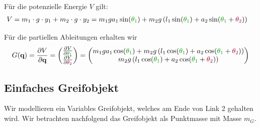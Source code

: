 \documentclass[a4paper, 12pt]{scrartcl}
\newcommand{\gruen}[2][gruen]{\textcolor{#1}{#2}}
\newcommand{\dunkelrot}[2][dunkelrot]{\textcolor{#1}{#2}}
\begin{document}
Für die potenzielle Energie $V$ gilt:
\begin{align*}
    V 
    &= m_1 \cdot g \cdot y_1 + m_2 \cdot g \cdot y_2 
    = m_1  g  a_1 \sin(\gruen{\theta_1}) 
    + m_2  g \left( l_1 \sin(\gruen{\theta_1}) 
    + a_2 \sin(\gruen{\theta_1} + \dunkelrot{\theta_2}) \right)
\end{align*}

Für die partiellen Ableitungen erhalten wir
\begin{align*}
    G(\textbf{q})
    =
    \frac{\partial V}{\partial \textbf{q}}
    =
    \begin{pmatrix}
        \frac{\partial V}{\partial \gruen{\theta_1}} \\
        \frac{\partial V}{\partial \dunkelrot{\theta_2}}
    \end{pmatrix}
    =
    \begin{pmatrix}
        m_1  g  a_1 \cos(\gruen{\theta_1}) + m_2  g \left( l_1 \cos(\gruen{\theta_1}) 
        + a_2 \cos(\gruen{\theta_1} + \dunkelrot{\theta_2}) \right) \\
        m_2  g \left( l_1 \cos(\gruen{\theta_1}) + a_2 \cos(\gruen{\theta_1} 
        + \dunkelrot{\theta_2}) \right)
    \end{pmatrix}
\end{align*}

\newpage
\subsection{Einfaches Greifobjekt}
Wir modellieren ein Variables Greifobjekt, welches am Ende von Link 2 gehalten wird. 
Wir betrachten nachfolgend das Greifobjekt als Punktmasse mit Masse $m_G$. 
\end{document}
